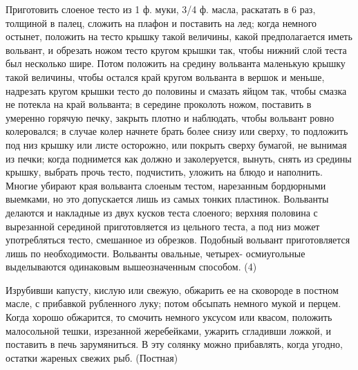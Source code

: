 Приготовить слоеное тесто из 1 ф. муки, 3/4 ф. масла, раскатать в 6 раз, толщиной в палец, сложить на плафон и поставить на лед; когда немного остынет, положить на тесто крышку такой величины, какой предполагается иметь вольвант, и обрезать ножом тесто кругом крышки так, чтобы нижний слой теста был несколько шире. Потом положить на средину вольванта маленькую крышку такой величины, чтобы остался край кругом вольванта в вершок и меньше, надрезать кругом крышки тесто до половины и смазать яйцом так, чтобы смазка не потекла на край вольванта; в середине проколоть ножом, поставить в умеренно горячую печку, закрыть плотно и наблюдать, чтобы вольвант ровно колеровался; в случае колер начнете брать более снизу или сверху, то подложить под низ крышку или листе осторожно, или покрыть сверху бумагой, не вынимая из печки; когда поднимется как должно и заколеруется, вынуть, снять из средины крышку, выбрать прочь тесто, подчистить, уложить на блюдо и наполнить. Многие убирают края вольванта слоеным тестом, нарезанным бордюрными выемками, но это допускается лишь из самых тонких пластинок. Вольванты делаются и накладные из двух кусков теста слоеного; верхняя половина с вырезанной серединой приготовляется из цельного теста, а под низ может употребляться тесто, смешанное из обрезков. Подобный вольвант приготовляется лишь по необходимости. Вольванты овальные, четырех- осмиугольные выделываются одинаковым вышеозначенным способом. (4) 


Изрубивши капусту, кислую или свежую, обжарить ее на сковороде в постном масле, с прибавкой рубленного луку; потом обсыпать немного мукой и перцем. Когда хорошо обжарится, то смочить немного уксусом или квасом, положить малосольной тешки, изрезанной жеребейками, ужарить сгладивши ложкой, и поставить в печь зарумяниться. В эту солянку можно прибавлять, когда угодно, остатки жареных свежих рыб. (Постная)


